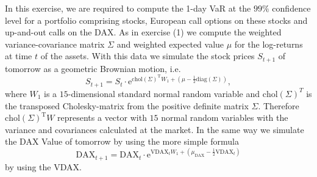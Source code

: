 \documentclass[10pt,a4paper]{article}
\theoremstyle{definition}
\begin{document}
		In this exercise, we are required to compute the 1-day VaR at the $99\%$ confidence level for a portfolio comprising stocks, European call options on these stocks and up-and-out calls on the DAX. As in exercise (1) we compute the weighted variance-covariance matrix $\Sigma$ and weighted expected value $\mu$ for the log-returns at time $t$ of the assets. With this data we simulate the stock prices $S_{t+1}$ of tomorrow as
		a geometric Brownian motion, i.e.
		\[
			S_{t+1}=S_t\cdot \mathrm{e}^{\mathrm{chol}(\Sigma)^\mathrm{T} W_1+\left(\mu-\frac12 
			\mathrm{diag}(\Sigma)\right)},
		\]
		where $W_1$ is a $15$-dimensional standard normal random variable
and $\mathrm{chol}(\Sigma)^T$ is the transposed Cholesky-matrix from the positive definite matrix $\Sigma$. Therefore $\mathrm{chol}(\Sigma)^\mathrm{T} W$ represents a vector with $15$ normal random variables with the variance and covariances calculated at the market.  
In the same way we simulate the DAX Value of tomorrow by using the more simple formula
\[
	\mathrm{DAX}_{t+1}=	\mathrm{DAX}_{t}\cdot \mathrm{e}^{\mathrm{VDAX}_t W_1+\left(\mu_{\mathrm{DAX}}-\frac12 
			\mathrm{VDAX}_t\right)}
\]
by using the VDAX.
\end{document}
